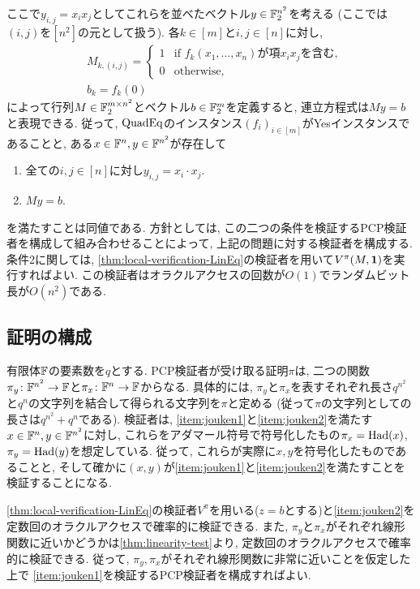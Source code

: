   ここで$y_{i,j}=x_ix_j$としてこれらを並べたベクトル$y\in\mathbb{F}_2^{n^2}$を考える (ここでは$(i,j)$を$[n^2]$の元として扱う).
  各$k\in[m]$と$i,j\in[n]$に対し,
  \begin{align}
    &M_{k,(i,j)} = \begin{cases}
      1 & \text{if $f_k(x_1,\dots,x_n)$が項$x_i x_j$を含む},\\
      0 & \text{otherwise},
    \end{cases} \label{eq:M-matrix}\\
    &b_k = f_k(0) \label{eq:b-vector}
  \end{align}
  によって行列$M\in\mathbb{F}_2^{m\times n^2}$とベクトル$b\in\mathbb{F}_2^m$を定義すると, 連立方程式は$My=b$と表現できる.
  従って,
  $\text{QuadEq}$のインスタンス$(f_i)_{i\in[m]}$がYesインスタンスであることと, ある$x\in\mathbb{F}^n,y\in\mathbb{F}^{n^2}$が存在して
  \begin{enumerate}[label=\textbf{条件\arabic*}, leftmargin=1.5cm]
    \item 全ての$i,j\in [n]$に対し$y_{i,j}=x_i\cdot x_j$. \label{item:jouken1}
    \item $My=b$. \label{item:jouken2}
  \end{enumerate}  
  を満たすことは同値である.
  方針としては, この二つの条件を検証するPCP検証者を構成して組み合わせることによって, 上記の問題に対する検証者を構成する.
  条件2に関しては, \cref{thm:local-verification-LinEq}の検証者を用いて$V^\pi(M,\mathbf{1})$を実行すればよい.
  この検証者はオラクルアクセスの回数が$O(1)$でランダムビット長が$O(n^2)$である.

  \subsection{証明の構成}
  有限体$\mathbb{F}$の要素数を$q$とする.
  PCP検証者が受け取る証明$\pi$は, 二つの関数$\pi_y\colon\mathbb{F}^{n^2}\to\mathbb{F}$と$\pi_x\colon\mathbb{F}^n\to\mathbb{F}$からなる.
  具体的には, $\pi_y$と$\pi_x$を表すそれぞれ長さ$q^{n^2}$と$q^n$の文字列を結合して得られる文字列を$\pi$と定める (従って$\pi$の文字列としての長さは$q^{n^2}+q^n$である).
  検証者は, \ref{item:jouken1}と\ref{item:jouken2}を満たす$x\in\mathbb{F}^n,y\in\mathbb{F}^{n^2}$に対し, これらをアダマール符号で符号化したもの$\pi_x=\mathrm{Had}(x)$, $\pi_y = \mathrm{Had}(y)$を想定している.
  従って, これらが実際に$x,y$を符号化したものであることと, そして確かに$(x,y)$が\ref{item:jouken1}と\ref{item:jouken2}を満たすことを検証することになる.
  
  \cref{thm:local-verification-LinEq}の検証者$V^\pi$を用いる($z=b$とする)と\ref{item:jouken2}を定数回のオラクルアクセスで確率的に検証できる.
  また, $\pi_y$と$\pi_x$がそれぞれ線形関数に近いかどうかは\cref{thm:linearity-test}より, 定数回のオラクルアクセスで確率的に検証できる.
  従って, $\pi_y,\pi_x$がそれぞれ線形関数に非常に近いことを仮定した上で
  \ref{item:jouken1}を検証するPCP検証者を構成すればよい.

